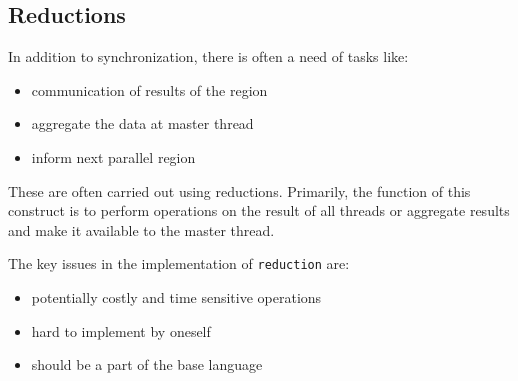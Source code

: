 \documentclass[12pt, a4paper]{report}
\begin{document}
\subsection{Reductions}
In addition to synchronization, there is often a need of tasks like:
\begin{itemize}
    \item communication of results of the region
    \item aggregate the data at master thread
    \item inform next parallel region
\end{itemize}
These are often carried out using reductions. Primarily, the function of this construct is to perform operations on the result of all threads or aggregate
results and make it available to the master thread.

The key issues in the implementation of \verb$reduction$ are:
\begin{itemize}
    \item potentially costly and time sensitive operations
    \item hard to implement by oneself
    \item should be a part of the base language
\end{itemize}
\end{document}
